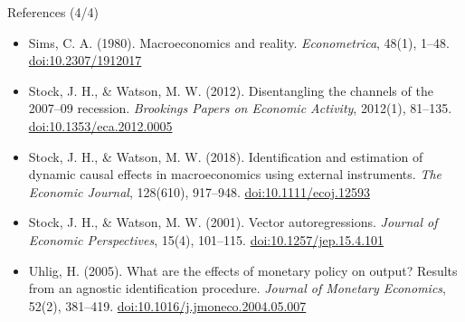 \begin{frame}{References (4/4)}
\begin{itemize}
    \item Sims, C. A. (1980). Macroeconomics and reality. \textit{Econometrica}, 48(1), 1--48. \href{https://doi.org/10.2307/1912017}{doi:10.2307/1912017}
    \item Stock, J. H., \& Watson, M. W. (2012). Disentangling the channels of the 2007--09 recession. \textit{Brookings Papers on Economic Activity}, 2012(1), 81--135. \href{https://doi.org/10.1353/eca.2012.0005}{doi:10.1353/eca.2012.0005}
    \item Stock, J. H., \& Watson, M. W. (2018). Identification and estimation of dynamic causal effects in macroeconomics using external instruments. \textit{The Economic Journal}, 128(610), 917--948. \href{https://doi.org/10.1111/ecoj.12593}{doi:10.1111/ecoj.12593}
    \item Stock, J. H., \& Watson, M. W. (2001). Vector autoregressions. \textit{Journal of Economic Perspectives}, 15(4), 101--115. \href{https://doi.org/10.1257/jep.15.4.101}{doi:10.1257/jep.15.4.101}
    \item Uhlig, H. (2005). What are the effects of monetary policy on output? Results from an agnostic identification procedure. \textit{Journal of Monetary Economics}, 52(2), 381--419. \href{https://doi.org/10.1016/j.jmoneco.2004.05.007}{doi:10.1016/j.jmoneco.2004.05.007}
\end{itemize}
\end{frame}


